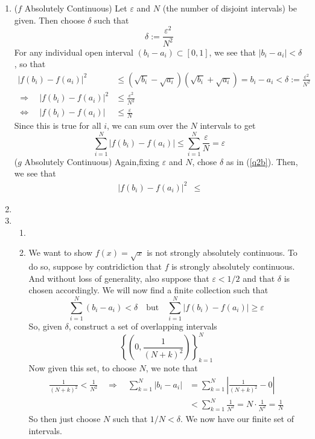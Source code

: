 \documentclass[12pt]{article}
\theoremstyle{plain}
\theoremstyle{definition}
\theoremstyle{remark}
\begin{document}
\begin{enumerate}
\begin{enumerate}
\item ($f$ Absolutely Continuous) Let $\varepsilon$ and $N$ (the number of disjoint intervals) be given. Then choose $\delta$ such that 
\begin{equation}
    \label{q2b}
    \delta:= \frac{\varepsilon^2}{N^2}
\end{equation}
For any individual open interval $(b_i-a_i)\subset[0,1]$, we see that $|b_i-a_i|<\delta$, so that
\begin{align*}
    |f({b_i})-f({a_i})|^2 &\leq
    \left(\sqrt{b_i}-\sqrt{a_i}\right)\left(\sqrt{b_i}+\sqrt{a_i}\right) 
    = b_i - a_i < \delta := \frac{\varepsilon^2}{N^2} \\
    \Rightarrow\quad
    |f({b_i})-f({a_i})|^2 &\leq \frac{\varepsilon^2}{N^2} \\
    \Leftrightarrow\quad
    |f({b_i})-f({a_i})| &\leq \frac{\varepsilon}{N} 
\end{align*}
Since this is true for all $i$, we can sum over the $N$ intervals to get 
\[
  \sum_{i=1}^N  |f({b_i})-f({a_i})| 
  \leq \sum_{i=1}^N\frac{\varepsilon}{N} = \varepsilon
\]
($g$ Absolutely Continuous) Again,fixing $\varepsilon$ and $N$, chose $\delta$ as in (\ref{q2b}). Then, we see that
\begin{align*}
    |f({b_i})-f({a_i})|^2 &\leq
\end{align*}

\item 

\item 
\begin{enumerate} 

\item 

\item We want to show $f(x)=\sqrt{x}$ is not strongly absolutely continuous. To do so, suppose by contridiction that $f$ is strongly absolutely continuous. And without loss of generality, also suppose that $\varepsilon<1/2$ and that $\delta$ is chosen accordingly. We will now find a finite collection such that
\[
    \sum_{i=1}^N (b_i-a_i) < \delta
    \quad\text{but}\quad
    \sum_{i=1}^N |f(b_i)-f(a_i)| \geq \varepsilon 
\]
So, given $\delta$, construct a set of overlapping intervals 
\[
    \left\{\left(0,\frac{1}{(N+k)^2}\right)\right\}^N_{k=1}
\]
Now given this set, to choose $N$, we note that
\begin{align*}
    \frac{1}{(N+k)^2} <  \frac{1}{N^2}  
    \quad\Rightarrow\quad
    \sum_{k=1}^N |b_i-a_i| &=
    \sum_{k=1}^N \left\lvert\frac{1}{(N+k)^2}-0\right\rvert \\
    &<\sum_{k=1}^N \frac{1}{N^2}
     =N\cdot \frac{1}{N^2} = \frac{1}{N}
\end{align*}
So then just choose $N$ such that $1/N < \delta$. We now have our finite set of intervals. 


\end{enumerate}
\end{enumerate}
\end{enumerate}
\end{document}
